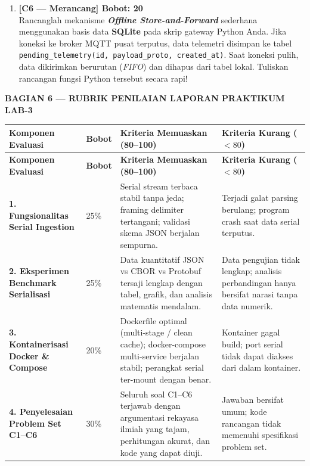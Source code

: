 \documentclass[11pt,a4paper]{article}
\newcommand{\secbanner}[2]{%
    \vspace{8pt}%
    \noindent\colorbox{unibnavy}{%
        \parbox{\dimexpr\textwidth-2\fboxsep\relax}{%
            \vspace{4pt}\textbf{\large\color{white}#1 --- #2}\vspace{4pt}%
        }%
    }%
    \vspace{4pt}%
}
\begin{document}
\begin{enumerate}
    \item \textbf{[C6 --- Merancang] Bobot: 20}\\
    Rancanglah mekanisme \textbf{\textit{Offline Store-and-Forward}} sederhana menggunakan basis data \textbf{SQLite} pada skrip gateway Python Anda. Jika koneksi ke broker MQTT pusat terputus, data telemetri disimpan ke tabel \texttt{pending\_telemetry(id, payload\_proto, created\_at)}. Saat koneksi pulih, data dikirimkan berurutan (\textit{FIFO}) dan dihapus dari tabel lokal. Tuliskan rancangan fungsi Python tersebut secara rapi!
\end{enumerate}

\secbanner{BAGIAN 6}{RUBRIK PENILAIAN LAPORAN PRAKTIKUM LAB-3}

{\small
\begin{longtable}{|L{3.0cm}|C{1.3cm}|L{5.5cm}|L{5.5cm}|}
\hline
{}
\textbf{Komponen Evaluasi} & \textbf{Bobot} & \textbf{Kriteria Memuaskan (80--100)} & \textbf{Kriteria Kurang ($<80$)} \\
\hline
\endfirsthead
\hline
{}
\textbf{Komponen Evaluasi} & \textbf{Bobot} & \textbf{Kriteria Memuaskan (80--100)} & \textbf{Kriteria Kurang ($<80$)} \\
\hline
\endhead
\textbf{1. Fungsionalitas Serial Ingestion} & 25\% & Serial stream terbaca stabil tanpa jeda; framing delimiter tertangani; validasi skema JSON berjalan sempurna. & Terjadi galat parsing berulang; program crash saat data serial terputus. \\
\hline
\textbf{2. Eksperimen Benchmark Serialisasi} & 25\% & Data kuantitatif JSON vs CBOR vs Protobuf tersaji lengkap dengan tabel, grafik, dan analisis matematis mendalam. & Data pengujian tidak lengkap; analisis perbandingan hanya bersifat narasi tanpa data numerik. \\
\hline
\textbf{3. Kontainerisasi Docker \& Compose} & 20\% & Dockerfile optimal (multi-stage / clean cache); docker-compose multi-service berjalan stabil; perangkat serial ter-mount dengan benar. & Kontainer gagal build; port serial tidak dapat diakses dari dalam kontainer. \\
\hline
\textbf{4. Penyelesaian Problem Set C1--C6} & 30\% & Seluruh soal C1--C6 terjawab dengan argumentasi rekayasa ilmiah yang tajam, perhitungan akurat, dan kode yang dapat diuji. & Jawaban bersifat umum; kode rancangan tidak memenuhi spesifikasi problem set. \\
\hline
\end{longtable}
}
\end{document}
